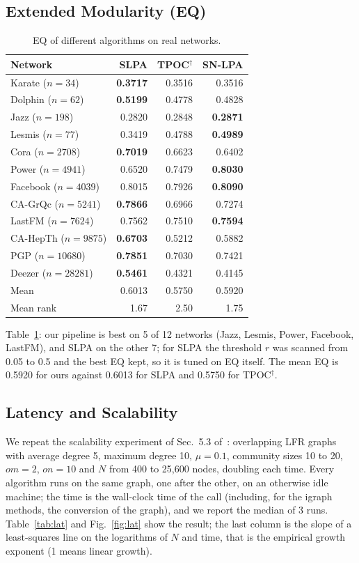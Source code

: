 \documentclass[conference]{IEEEtran}
\begin{document}
\subsection{Extended Modularity (EQ)}
\begin{table}[!htbp]
\centering
\caption{EQ of different algorithms on real networks.}
\label{tab:eq}
\scriptsize
\begin{tabular*}{\columnwidth}{@{\extracolsep{\fill}}lrrr}
\toprule
Network & SLPA & TPOC$^{\dagger}$ & SN-LPA \\
\midrule
Karate ($n{=}34$) & \textbf{0.3717} & 0.3516 & 0.3516 \\
Dolphin ($n{=}62$) & \textbf{0.5199} & 0.4778 & 0.4828 \\
Jazz ($n{=}198$) & 0.2820 & 0.2848 & \textbf{0.2871} \\
Lesmis ($n{=}77$) & 0.3419 & 0.4788 & \textbf{0.4989} \\
Cora ($n{=}2708$) & \textbf{0.7019} & 0.6623 & 0.6402 \\
Power ($n{=}4941$) & 0.6520 & 0.7479 & \textbf{0.8030} \\
Facebook ($n{=}4039$) & 0.8015 & 0.7926 & \textbf{0.8090} \\
CA-GrQc ($n{=}5241$) & \textbf{0.7866} & 0.6966 & 0.7274 \\
LastFM ($n{=}7624$) & 0.7562 & 0.7510 & \textbf{0.7594} \\
CA-HepTh ($n{=}9875$) & \textbf{0.6703} & 0.5212 & 0.5882 \\
PGP ($n{=}10680$) & \textbf{0.7851} & 0.7030 & 0.7421 \\
Deezer ($n{=}28281$) & \textbf{0.5461} & 0.4321 & 0.4145 \\
\midrule
Mean & 0.6013 & 0.5750 & 0.5920 \\
Mean rank & 1.67 & 2.50 & 1.75 \\
\bottomrule
\end{tabular*}
\end{table}
Table~\ref{tab:eq}: our pipeline is best on 5 of 12 networks (Jazz, Lesmis, Power, Facebook, LastFM), and SLPA on the other 7; for SLPA the threshold $r$ was scanned from 0.05 to 0.5 and the best EQ kept, so it is tuned on EQ itself. The mean EQ is 0.5920 for ours against 0.6013 for SLPA and 0.5750 for TPOC$^{\dagger}$.

\subsection{Latency and Scalability}\label{sec:latency}
We repeat the scalability experiment of Sec.~5.3 of~\cite{kong2026}: overlapping LFR graphs with average degree 5, maximum degree 10, $\mu{=}0.1$, community sizes 10 to 20, $om{=}2$, $on{=}10$ and $N$ from 400 to 25,600 nodes, doubling each time. Every algorithm runs on the same graph, one after the other, on an otherwise idle machine; the time is the wall-clock time of the call (including, for the igraph methods, the conversion of the graph), and we report the median of 3 runs. Table~\ref{tab:lat} and Fig.~\ref{fig:lat} show the result; the last column is the slope of a least-squares line on the logarithms of $N$ and time, that is the empirical growth exponent (1 means linear growth).
\end{document}
